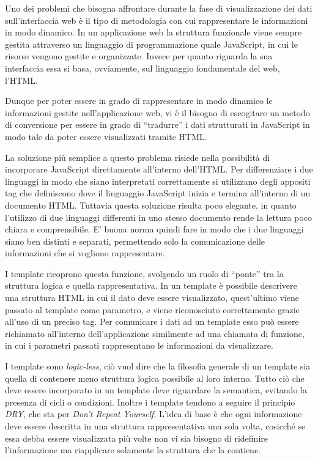 Uno dei problemi che bisogna affrontare durante la fase di visualizzazione dei dati sull'interfaccia web è il tipo di metodologia con cui rappresentare le informazioni in modo dinamico. In un applicazione web la struttura funzionale viene sempre gestita attraverso un linguaggio di programmazione quale JavaScript, in cui le risorse vengono gestite e organizzate. Invece per quanto riguarda la sua interfaccia essa si basa, ovviamente, sul linguaggio fondamentale del web, l'HTML.

Dunque per poter essere in grado di rappresentare in modo dinamico le informazioni gestite nell'applicazione web, vi è il bisogno di escogitare un metodo di conversione per essere in grado di ``tradurre'' i dati strutturati in JavaScript in modo tale da poter essere visualizzati tramite HTML.

La soluzione più semplice a questo problema risiede nella possibilità di incorporare JavaScript direttamente all'interno dell'HTML. Per differenziare i due linguaggi in modo che siano interpretati correttamente si utilizzano degli appositi tag che definiscono dove il linguaggio JavaScript inizia e termina all'interno di un documento HTML. Tuttavia questa soluzione risulta poco elegante, in quanto l'utilizzo di due linguaggi differenti in uno stesso documento rende la lettura poco chiara e comprensibile. E' buona norma quindi fare in modo che i due linguaggi siano ben distinti e separati, permettendo solo la comunicazione delle informazioni che si vogliono rappresentare.

I template ricoprono questa funzione, svolgendo un ruolo di ``ponte'' tra la struttura logica e quella rappresentativa. In un template è possibile descrivere una struttura HTML in cui il dato deve essere visualizzato, quest'ultimo viene passato al template come parametro, e viene riconosciuto correttamente grazie all'uso di un preciso tag. Per comunicare i dati ad un template esso può essere richiamato all'interno dell'applicazione similmente ad una chiamata di funzione, in cui i parametri passati rappresentano le informazioni da visualizzare.

I template sono {\itshape logic-less}, ciò vuol dire che la filosofia generale di un template sia quella di contenere meno struttura logica possibile al loro interno. Tutto ciò che deve essere incorporato in un template deve riguardare la semantica, evitando la presenza di cicli o condizioni. Inoltre i template tendono a seguire il principio {\itshape DRY}, che sta per {\itshape Don't Repeat Yourself}. L'idea di base è che ogni informazione deve essere descritta in una struttura rappresentativa una sola volta, cosicché se essa debba essere visualizzata più volte non vi sia bisogno di ridefinire l'informazione ma riapplicare solamente la struttura che la contiene.

